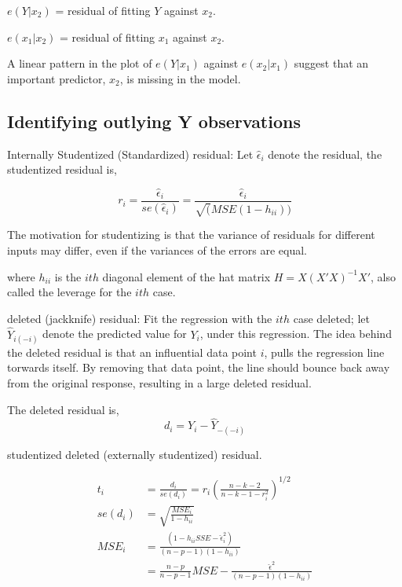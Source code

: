\documentclass[10pt]{article}
\newcommand{\hlDef}[1]{\colorbox{Thistle2}{#1}}
\begin{document}
\begin{multicols}{3}
    $e(Y|x_2)$ = residual of fitting $Y$ against $x_2$.

    $e(x_1|x_2)$ = residual of fitting $x_1$ against $x_2$.

    A linear pattern in the plot of $e(Y|x_1)$ against $e(x_2|x_1)$ suggest that an important predictor, $x_2$, is missing in the model.

    \subsection{Identifying outlying Y observations}

    \hlDef{Internally Studentized (Standardized) residual:}  Let $\hat\epsilon_i$ denote the residual, the studentized residual is,

    \begin{equation}
        r_i = \frac{\hat\epsilon_i}{se(\hat\epsilon_i)} = \frac{\hat\epsilon_i}{\sqrt(MSE(1-h_{ii}))}
    \end{equation}

    The motivation for studentizing is that the variance of residuals for different inputs may differ, even if the variances of the errors are equal.
    
    where $h_{ii}$ is the $ith$ diagonal element of the hat matrix $H = X(X' X)^{-1} X'$, also called the \hlDef{leverage} for the $ith$ case.

    \hlDef{deleted (jackknife) residual:} Fit the regression with the $ith$ case deleted; let $\hat Y_{i(-i)}$ denote the predicted value for $Y_i$, under this regression.
    The idea behind the deleted residual is that an influential data point $i$, pulls the regression line torwards itself. By removing that data point, the line should bounce back away from the original response, resulting in a large deleted residual.
    
    The deleted residual is,
    \begin{equation}
        d_i = Y_i - \hat Y_{-(-i)}
    \end{equation}


    \hlDef{studentized deleted (externally studentized) residual}.

    \begin{align}
        t_i & = \frac{d_i}{se(d_i)} = r_i \left(\frac{n - k - 2}{n - k - 1 - r_i^2}\right)^{1/2}\\
        se(d_i) & = \sqrt{\frac{MSE_i}{1 - h_{ii}}} \\
        MSE_i & = \frac{(1-h_{ii} SSE - \hat\epsilon_i^2)}{(n - p - 1) (1 - h_{ii})}  \\
        & = \frac{n-p}{n-p-1} MSE - \frac{\hat\epsilon^2}{(n-p-1)(1-h_{ii})}
    \end{align}


\end{multicols}
\end{document}
